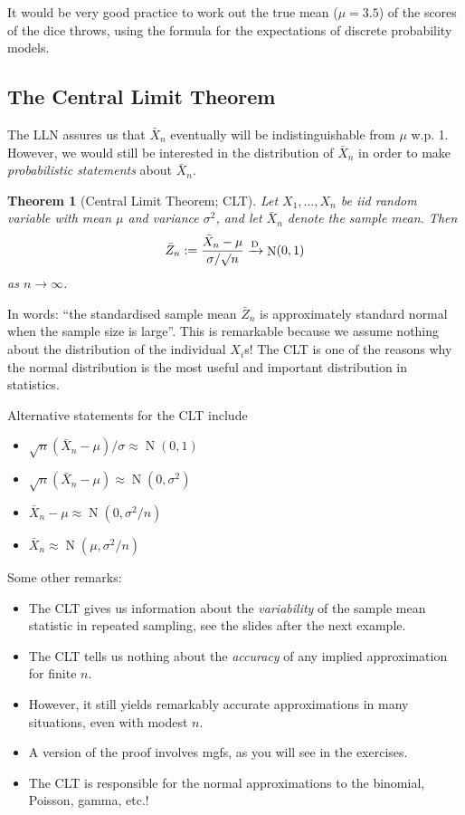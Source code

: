 \documentclass[
]{book}
\providecommand{\tightlist}{%
  \setlength{\itemsep}{0pt}\setlength{\parskip}{0pt}}
\DeclareMathOperator{\N}{N}
\newtheorem{theorem}{Theorem}[chapter]
\theoremstyle{definition}
\theoremstyle{definition}
\theoremstyle{definition}
\theoremstyle{definition}
\theoremstyle{remark}
\begin{document}
It would be very good practice to work out the true mean (\(\mu=3.5\)) of the scores of the dice throws, using the formula for the expectations of discrete probability models.

\hypertarget{the-central-limit-theorem}{%
\subsection{The Central Limit Theorem}\label{the-central-limit-theorem}}

The LLN assures us that \(\bar X_n\) eventually will be indistinguishable from \(\mu\) w.p. 1.
However, we would still be interested in the distribution of \(\bar X_n\) in order to make \emph{probabilistic statements} about \(\bar X_n\).

\begin{theorem}[Central Limit Theorem; CLT]
Let \(X_1,\dots,X_n\) be iid random variable with mean \(\mu\) and variance \(\sigma^2\), and let \(\bar X_n\) denote the sample mean. Then
\[
\bar Z_n := \frac{\bar X_n - \mu}{\sigma/\surd n} \xrightarrow{\text D} \N(0,1)
\]
as \(n\to \infty\).
\end{theorem}

In words: ``the standardised sample mean \(\bar Z_n\) is approximately standard normal when the sample size is large''.
This is remarkable because we assume nothing about the distribution of the individual \(X_i\)s!
The CLT is one of the reasons why the normal distribution is the most useful and important distribution in statistics.

Alternative statements for the CLT include

\begin{itemize}
\tightlist
\item
  \(\sqrt{n}(\bar X_n - \mu)/\sigma \approx \N(0,1)\)
\item
  \(\sqrt{n}(\bar X_n - \mu) \approx \N(0,\sigma^2)\)
\item
  \(\bar X_n - \mu \approx \N(0,\sigma^2/n)\)\\
\item
  \(\bar X_n \approx \N(\mu,\sigma^2/n)\)
\end{itemize}

Some other remarks:

\begin{itemize}
\tightlist
\item
  The CLT gives us information about the \emph{variability} of the sample mean statistic in repeated sampling, see the slides after the next example.
\item
  The CLT tells us nothing about the \emph{accuracy} of any implied approximation for finite \(n\).
\item
  However, it still yields remarkably accurate approximations in many situations, even with modest \(n\).
\item
  A version of the proof involves mgfs, as you will see in the exercises.
\item
  The CLT is responsible for the normal approximations to the binomial, Poisson, gamma, etc.!
\end{itemize}
\end{document}
